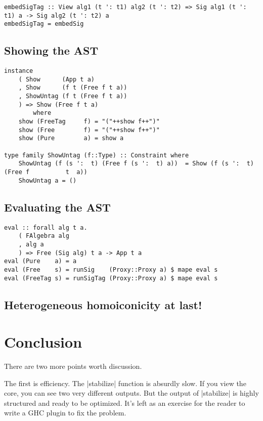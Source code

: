 \documentclass[preprint]{sigplanconf}
\theoremstyle{definition}
\begin{document}
\begin{lstlisting}
embedSigTag :: View alg1 (t ': t1) alg2 (t ': t2) => Sig alg1 (t ': t1) a -> Sig alg2 (t ': t2) a
embedSigTag = embedSig
\end{lstlisting}

\subsection{Showing the AST}

\begin{lstlisting}
instance
    ( Show      (App t a)
    , Show      (f t (Free f t a))
    , ShowUntag (f t (Free f t a))
    ) => Show (Free f t a)
        where
    show (FreeTag     f) = "("++show f++")"
    show (Free        f) = "("++show f++")"
    show (Pure        a) = show a

type family ShowUntag (f::Type) :: Constraint where
    ShowUntag (f (s ':  t) (Free f (s ':  t) a))  = Show (f (s ':  t) (Free f          t  a))
    ShowUntag a = ()
\end{lstlisting}

\subsection{Evaluating the AST}

\begin{lstlisting}
eval :: forall alg t a.
    ( FAlgebra alg
    , alg a
    ) => Free (Sig alg) t a -> App t a
eval (Pure    a) = a
eval (Free    s) = runSig    (Proxy::Proxy a) $ mape eval s
eval (FreeTag s) = runSigTag (Proxy::Proxy a) $ mape eval s
\end{lstlisting}

\subsection{Heterogeneous homoiconicity at last!}

\section{Conclusion}

There are two more points worth discussion.

The first is efficiency.
The |stabilize| function is absurdly slow.
If you view the core, you can see two very different outputs.
But the output of |stabilize| is highly structured and ready to be optimized.
It's left as an exercise for the reader to write a GHC plugin to fix the problem.
\end{document}
